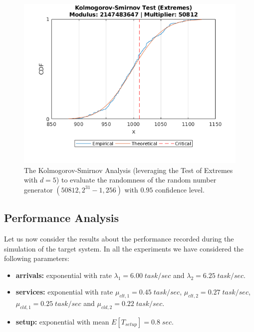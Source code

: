 \begin{figure}
	\includegraphics[width=\columnwidth]{fig/evaluation-randomness-kolmogorov-smirnov-50812}
	\caption{The Kolmogorov-Smirnov Analysis (leveraging the Test of Extremes with $d=5$) to evaluate the randomness of the random number generator $(50812,2^{31}-1, 256)$ with $0.95$ confidence level.}
	\label{fig:evaluation-randomness-kolmogorov-smirnov-50812}
\end{figure}


\subsection{Performance Analysis}
Let us now consider the results about the performance recorded during the simulation of the target system.
In all the experiments we have considered the following parameters:

\begin{itemize}
	\item \textbf{arrivals:} exponential with rate $\lambda_{1}=6.00\;task/sec$ and $\lambda_{2}=6.25\;task/sec$.
	\item \textbf{services:} exponential with rate $\mu_{clt,1}=0.45\;task/sec$, $\mu_{clt,2}=0.27\;task/sec$, $\mu_{cld,1}=0.25\;task/sec$ and $\mu_{cld,2}=0.22\;task/sec$.
	\item \textbf{setup:} exponential with mean $E[T_{setup}]=0.8\;sec$.
\end{itemize}

